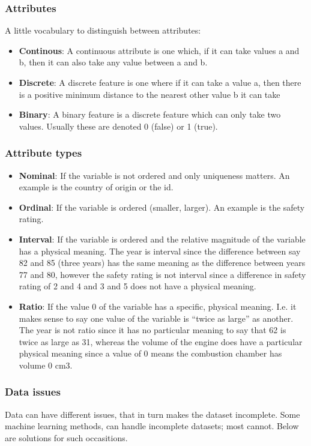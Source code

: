 \documentclass{article}
\begin{document}
\subsubsection{Attributes}
A little vocabulary to distinguish between attributes:
\begin{itemize}
    \item \textbf{Continous}: A continuous attribute is one which, if it can take values a and b, then it can also take any value between a and b. 
    \item \textbf{Discrete}: A discrete feature is one where if it can take a value a, then there is a positive minimum distance to the nearest other value b it can take 
    \item \textbf{Binary}: A binary feature is a discrete feature which can only take two values. Usually these are denoted 0 (false) or 1 (true).
\end{itemize}

\subsubsection{Attribute types}
\begin{itemize}
    \item \textbf{Nominal}: If the variable is not ordered and only uniqueness matters. An example is the country of origin or the id. 
    \item \textbf{Ordinal}: If the variable is ordered (smaller, larger). An example is the safety rating. 
    \item \textbf{Interval}: If the variable is ordered and the relative magnitude of the variable has a physical meaning. The year is interval since the diﬀerence between say 82 and 85 (three years) has the same meaning as the diﬀerence between years 77 and 80, however the safety rating is not interval since a diﬀerence in safety rating of 2 and 4 and 3 and 5 does not have a physical meaning. 
    \item \textbf{Ratio}: If the value 0 of the variable has a speciﬁc, physical meaning. I.e. it makes sense to say one value of the variable is “twice as large” as another. The year is not ratio since it has no particular meaning to say that 62 is twice as large as 31, whereas the volume of the engine does have a particular physical meaning since a value of 0 means the combustion chamber has volume 0 cm3.
\end{itemize}

\subsubsection{Data issues}
Data can have different issues, that in turn makes the dataset incomplete. Some machine learning methods, can handle incomplete datasets; most cannot. Below are solutions for such occasitions.
\end{document}
